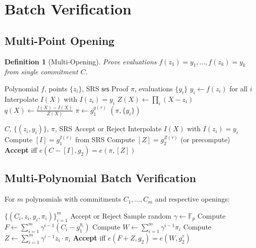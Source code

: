 \documentclass[11pt,a4paper]{article}
\newtheorem{definition}[theorem]{Definition}
\newcommand{\F}{\mathbb{F}}
\begin{document}
\section{Batch Verification}
\label{sec:batch}

\subsection{Multi-Point Opening}

\begin{definition}[Multi-Opening]
Prove evaluations $f(z_1) = y_1, \ldots, f(z_k) = y_k$ from single commitment $C$.
\end{definition}

\begin{algorithm}
\caption{Multi-Point Opening}
\label{alg:multi-open}
\begin{algorithmic}[1]
\Require Polynomial $f$, points $\{z_i\}$, SRS $\mathsf{srs}$
\Ensure Proof $\pi$, evaluations $\{y_i\}$
\State $y_i \gets f(z_i)$ for all $i$
\State Interpolate $I(X)$ with $I(z_i) = y_i$
\State $Z(X) \gets \prod_i (X - z_i)$ 
\State $q(X) \gets \frac{f(X) - I(X)}{Z(X)}$
\State $\pi \gets g_1^{q(\tau)}$
\State \Return $(\pi, \{y_i\})$
\end{algorithmic}
\end{algorithm}

\begin{algorithm}
\caption{Multi-Point Verification}
\label{alg:multi-verify}
\begin{algorithmic}[1]
\Require $C$, $\{(z_i, y_i)\}$, $\pi$, SRS
\Ensure Accept or Reject
\State Interpolate $I(X)$ with $I(z_i) = y_i$
\State Compute $[I] = g_1^{I(\tau)}$ from SRS
\State Compute $[Z] = g_2^{Z(\tau)}$ (or precompute)
\State \textbf{Accept} iff $e(C - [I], g_2) = e(\pi, [Z])$
\end{algorithmic}
\end{algorithm}

\subsection{Multi-Polynomial Batch Verification}

For $m$ polynomials with commitments $C_1, \ldots, C_m$ and respective openings:

\begin{algorithm}
\caption{Batch Verification}
\label{alg:batch-verify}
\begin{algorithmic}[1]
\Require $\{(C_i, z_i, y_i, \pi_i)\}_{i=1}^m$
\Ensure Accept or Reject
\State Sample random $\gamma \gets \F_p$
\State Compute $F \gets \sum_{i=1}^m \gamma^{i-1} (C_i - g_1^{y_i})$
\State Compute $W \gets \sum_{i=1}^m \gamma^{i-1} \pi_i$
\State Compute $Z \gets \sum_{i=1}^m \gamma^{i-1} z_i \cdot \pi_i$
\State \textbf{Accept} iff $e(F + Z, g_2) = e(W, g_2^\tau)$
\end{algorithmic}
\end{algorithm}
\end{document}

